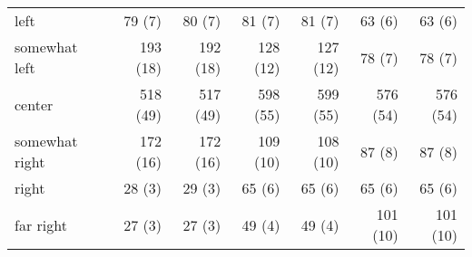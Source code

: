 \begin{table*}
\begin{tabular}[t]{lrrrrrr}
\hspace{1em}left & 79 (7) & 80 (7) & 81 (7) & 81 (7) & 63 (6) & 63 (6)\\
\hspace{1em}somewhat left & 193 (18) & 192 (18) & 128 (12) & 127 (12) & 78 (7) & 78 (7)\\
\hspace{1em}center & 518 (49) & 517 (49) & 598 (55) & 599 (55) & 576 (54) & 576 (54)\\
\hspace{1em}somewhat right & 172 (16) & 172 (16) & 109 (10) & 108 (10) & 87 (8) & 87 (8)\\
\hspace{1em}right & 28 (3) & 29 (3) & 65 (6) & 65 (6) & 65 (6) & 65 (6)\\
\hspace{1em}far right & 27 (3) & 27 (3) & 49 (4) & 49 (4) & 101 (10) & 101 (10)\\
\bottomrule
\end{tabular}
\end{table*}
